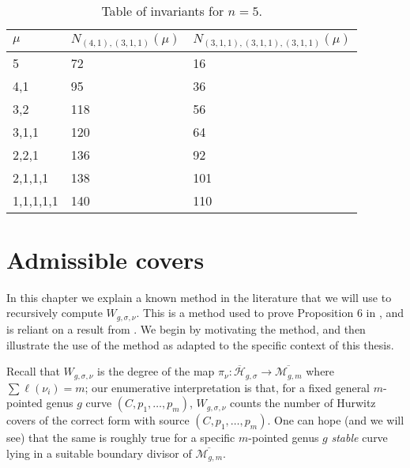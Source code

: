 \documentclass[thesis]{thesis-umich}           %
\newcommand{\Hb}{\overline{\mathcal H}}
\theoremstyle{definition}
\begin{document}
  \begin{table}[h]
    \caption{Table of invariants for $n=5$.}
    \centering
    ~\\
\begin{tabular}{|l|l|l|}
\hline
$\mu$             & $N_{(4,1),(3,1,1)}(\mu)$ & $N_{(3,1,1),(3,1,1),(3,1,1)}(\mu)$ \\ \hline
{5} & {72}                                       & {16}                    \\ \hline
4,1                     & {95}                                       & {36}                    \\ \hline
3,2                     & {118}                                      & {56}                    \\ \hline
3,1,1                   & {120}                                      & {64}                    \\ \hline
2,2,1                   & {136}                                      & {92}                    \\ \hline
2,1,1,1                 & {138}                                      & {101}                   \\ \hline
1,1,1,1,1               & {140}                                      & 110                                        \\ \hline
\end{tabular}
\end{table}

\chapter{Admissible covers}
\label{section:admissible}

In this chapter we explain a known method in the literature that we will use
to recursively compute $W_{g,\sigma,\nu}$. This is a method used to prove Proposition 6 in \cite{Generalized}, and is reliant on a result from \cite{Lian}. We begin by motivating the method, and then illustrate the use of the method as adapted to the specific context of this thesis.

Recall that $W_{g,\sigma,\nu}$ is the degree of the map $\pi_{\nu}:\Hb_{g,\sigma}\to\overline{\mathcal M_{g,m}}$
where $\sum\ell(\nu_i)=m$; our enumerative interpretation is that, for a fixed general $m$-pointed genus $g$ curve $(C,p_1,\dots,p_m)$, $W_{g,\sigma,\nu}$ counts the number of Hurwitz covers of the correct form with source $(C,p_1,\dots,p_m)$. One can hope (and we will see) that the same is roughly true for
a specific $m$-pointed genus $g$ {\it stable} curve lying in a suitable boundary divisor of $\overline{\mathcal M_{g,m}}$.
\end{document}
